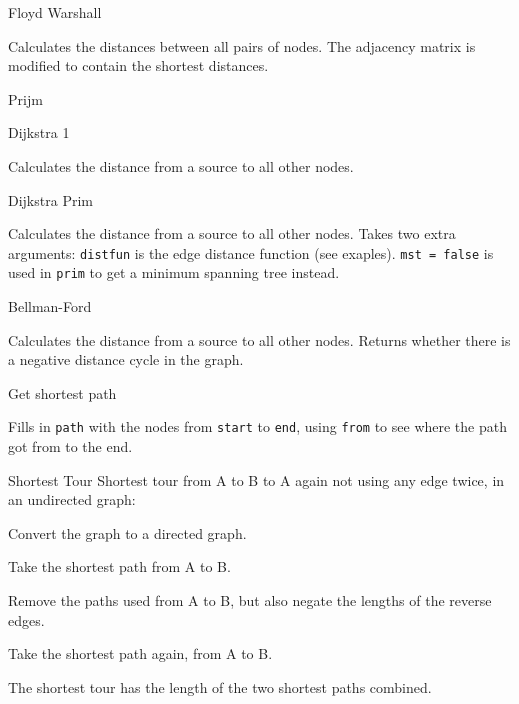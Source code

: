 \begin{algorithm}{Floyd Warshall}

Calculates the distances between all pairs of nodes.
The adjacency matrix is modified to contain the shortest distances.
\end{algorithm}

\begin{algorithm}{Prijm}
\end{algorithm}

\begin{algorithm}{Dijkstra 1}

Calculates the distance from a source to all other nodes.
\end{algorithm}

\begin{algorithm}{Dijkstra Prim}

Calculates the distance from a source to all other nodes.
Takes two extra arguments:
{\tt distfun} is the edge distance function (see exaples).
{\tt mst = false} is used in {\tt prim} to get a
minimum spanning tree instead.
\end{algorithm}

\begin{algorithm}{Bellman-Ford}

Calculates the distance from a source to all other nodes.
Returns whether there is a negative distance cycle in the graph.
\end{algorithm}

\begin{algorithm}{Get shortest path}

Fills in {\tt path} with the nodes from {\tt start} to {\tt end}, using
{\tt from} to see where the path got from to the end.
\end{algorithm}


\begin{algorithm}{Shortest Tour}
\description{} 
Shortest tour from A to B to A again not using any edge twice, in an
undirected graph:

Convert the graph to a directed graph.

Take the shortest path from A to B.

Remove the paths used from A to B, but also negate the lengths of the
reverse edges.

Take the shortest path again, from A to B.

The shortest tour has the length of the two shortest paths combined.
\end{algorithm}
